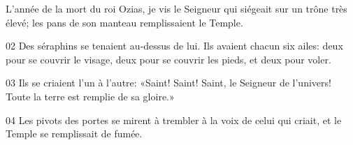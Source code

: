 L’année de la mort du roi Ozias, je vis le Seigneur qui siégeait sur un trône très élevé; les pans de son manteau remplissaient le Temple.

02 Des séraphins se tenaient au-dessus de lui. Ils avaient chacun six ailes: deux pour se couvrir le visage, deux pour se couvrir les pieds, et deux pour voler.

03 Ils se criaient l’un à l’autre: «Saint! Saint! Saint, le Seigneur de l’univers! Toute la terre est remplie de sa gloire.»

04 Les pivots des portes se mirent à trembler à la voix de celui qui criait, et le Temple se remplissait de fumée.
